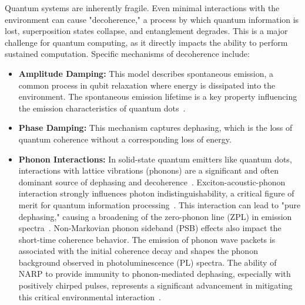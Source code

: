 \documentclass{article}
\begin{document}
Quantum systems are inherently fragile. Even minimal interactions with the environment can cause "decoherence," a process by which quantum information is lost, superposition states collapse, and entanglement degrades. This is a major challenge for quantum computing, as it directly impacts the ability to perform sustained computation. Specific mechanisms of decoherence include:
\begin{itemize}
    \item \textbf{Amplitude Damping:} This model describes spontaneous emission, a common process in qubit relaxation where energy is dissipated into the environment. The spontaneous emission lifetime is a key property influencing the emission characteristics of quantum dots~\cite{Kuhlmann2013TransformlimitedSP, Somaschi2015NearoptimalSS, Chen2018HighlyefficientEO, Liu2019ASS, Jns2015BrightNS, Reimer2012BrightSS, Reindl2019HighlyIS, Madsen2014EfficientOO, Wang2019TowardsOS, Tomm2021ABA, Huber2019FilterfreeSQ, Uppu2020OnchipDO, Muller2007ResonanceFF, Ate2009PostselectedIP, Kirvsanske2017IndistinguishableAE, Regidor2020ModellingQL}.
    \item \textbf{Phase Damping:} This mechanism captures dephasing, which is the loss of quantum coherence without a corresponding loss of energy.
    \item \textbf{Phonon Interactions:} In solid-state quantum emitters like quantum dots, interactions with lattice vibrations (phonons) are a significant and often dominant source of dephasing and decoherence~\cite{Lker2019ARO, Mathew2014SubpicosecondAR}. Exciton-acoustic-phonon interaction strongly influences photon indistinguishability, a critical figure of merit for quantum information processing~\cite{Gustin2017InfluenceOE}. This interaction can lead to "pure dephasing," causing a broadening of the zero-phonon line (ZPL) in emission spectra~\cite{Gustin2017InfluenceOE}. Non-Markovian phonon sideband (PSB) effects also impact the short-time coherence behavior. The emission of phonon wave packets is associated with the initial coherence decay and shapes the phonon background observed in photoluminescence (PL) spectra. The ability of NARP to provide immunity to phonon-mediated dephasing, especially with positively chirped pulses, represents a significant advancement in mitigating this critical environmental interaction~\cite{Wilbur2022NotchfilteredAR}.
\end{itemize}
\end{document}
